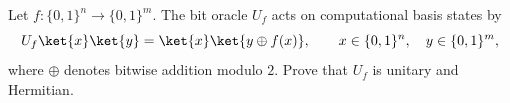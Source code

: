 Let $f:\{0,1\}^n\to\{0,1\}^m$.  The bit oracle $U_f$ acts on computational basis states by
$$
    U_f\ket{x}\ket{y}=\ket{x}\ket{y\oplus f(x)},
    \qquad x\in\{0,1\}^n,
    \quad y\in\{0,1\}^m,
$$
where $\oplus$ denotes bitwise addition modulo $2$.  Prove that $U_f$ is unitary and Hermitian.
